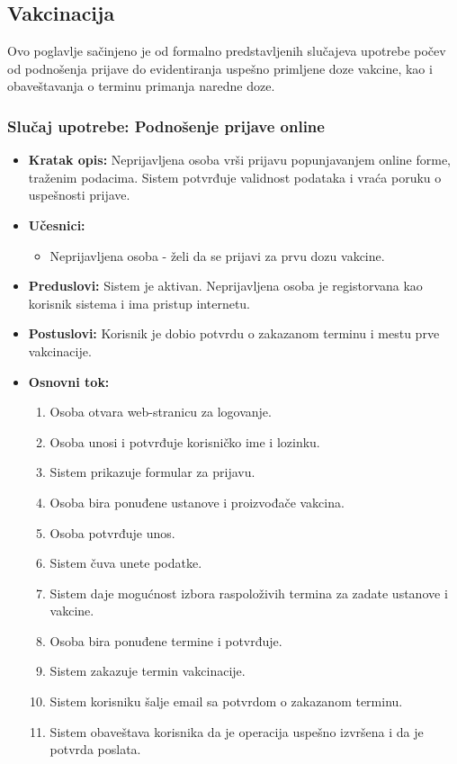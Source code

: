 \documentclass[titlepage]{article}
\begin{document}
\subsection{Vakcinacija}
Ovo poglavlje sačinjeno je od formalno predstavljenih slučajeva upotrebe počev od podnošenja prijave do evidentiranja uspešno primljene doze vakcine, kao i obaveštavanja o terminu primanja naredne doze.

\subsubsection{Slučaj upotrebe: Podnošenje prijave online}
\begin{itemize}
    \item \textbf{Kratak opis:} Neprijavljena osoba vrši prijavu popunjavanjem online forme, traženim podacima. Sistem potvrđuje validnost podataka i vraća poruku o uspešnosti prijave.
    \item \textbf{Učesnici:}
        \begin{itemize}
            \item Neprijavljena osoba - želi da se prijavi za prvu dozu vakcine.
        \end{itemize}
    \item \textbf{Preduslovi:} Sistem je aktivan. Neprijavljena osoba je registorvana kao korisnik sistema i ima pristup internetu.
    \item \textbf{Postuslovi:} Korisnik je dobio potvrdu o zakazanom terminu i mestu prve vakcinacije.
    \item \textbf{Osnovni tok:}
        \begin{enumerate}
            \item Osoba otvara web-stranicu za logovanje.
	    \item Osoba unosi i potvrđuje korisničko ime i lozinku.
            \item Sistem prikazuje formular za prijavu.
            \item Osoba bira ponuđene ustanove i proizvođače vakcina.
            \item Osoba potvrđuje unos.
            \item Sistem čuva unete podatke.
	    \item Sistem daje mogućnost izbora raspoloživih termina za zadate ustanove i vakcine.
	    \item Osoba bira ponuđene termine i potvrđuje. 
            \item Sistem zakazuje termin vakcinacije.
	    \item Sistem korisniku šalje email sa potvrdom o zakazanom terminu.
            \item Sistem obaveštava korisnika da je operacija uspešno izvršena i da je potvrda poslata.
	\end{enumerate}
     

\end{itemize}
\end{document}
